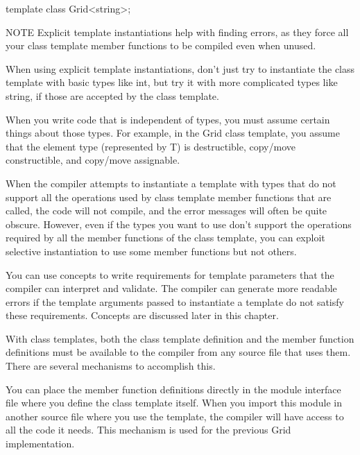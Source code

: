 \begin{cpp}
template class Grid<string>;
\end{cpp}

\begin{myNotic}{NOTE}
Explicit template instantiations help with finding errors, as they force all your class template member functions to be compiled even when unused.
\end{myNotic}

When using explicit template instantiations, don’t just try to instantiate the class template with basic types like int, but try it with more complicated types like string, if those are accepted by the class template.


When you write code that is independent of types, you must assume certain things about those types. For example, in the Grid class template, you assume that the element type (represented by T) is destructible, copy/move constructible, and copy/move assignable.

When the compiler attempts to instantiate a template with types that do not support all the operations used by class template member functions that are called, the code will not compile, and the error messages will often be quite obscure. However, even if the types you want to use don’t support the operations required by all the member functions of the class template, you can exploit selective instantiation to use some member functions but not others.

You can use concepts to write requirements for template parameters that the compiler can interpret and validate. The compiler can generate more readable errors if the template arguments passed to instantiate a template do not satisfy these requirements. Concepts are discussed later in this chapter.


With class templates, both the class template definition and the member function definitions must be available to the compiler from any source file that uses them. There are several mechanisms to accomplish this.


You can place the member function definitions directly in the module interface file where you define the class template itself. When you import this module in another source file where you use the template, the compiler will have access to all the code it needs. This mechanism is used for the previous Grid implementation.

